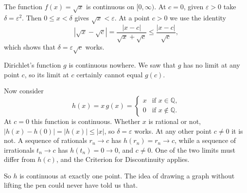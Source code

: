 \begin{example}\label{ex:sqrt-continuous}
The function $f(x) = \sqrt{x}$ is continuous on $[0, \infty)$.  At $c = 0$, given $\varepsilon > 0$ take $\delta = \varepsilon^2$.  Then $0 \leq x < \delta$ gives $\sqrt{x} < \varepsilon$.  At a point $c > 0$ we use the identity
\[ |\sqrt{x} - \sqrt{c}| = \frac{|x - c|}{\sqrt{x} + \sqrt{c}} \leq \frac{|x - c|}{\sqrt{c}}, \]
which shows that $\delta = \varepsilon\sqrt{c}$ works.
\end{example}

\begin{example}
Dirichlet's function $g$ is continuous nowhere.  We saw that $g$ has no limit at any point $c$, so its limit at $c$ certainly cannot equal $g(c)$.
\end{example}

\begin{example}\label{ex:one-point}
Now consider
\begin{displaymath}
   h(x) = x\,g(x) = \left\{
     \begin{array}{ll}
       x & \text{if } x \in \mathbb{Q}, \\
       0 & \text{if } x \notin \mathbb{Q}.
     \end{array}
   \right.
\end{displaymath}
At $c = 0$ this function is continuous.  Whether $x$ is rational or not, $|h(x) - h(0)| = |h(x)| \leq |x|$, so $\delta = \varepsilon$ works.  At any other point $c \neq 0$ it is not.  A sequence of rationals $r_n \to c$ has $h(r_n) = r_n \to c$, while a sequence of irrationals $t_n \to c$ has $h(t_n) = 0 \to 0$, and $c \neq 0$.  One of the two limits must differ from $h(c)$, and the Criterion for Discontinuity applies.

So $h$ is continuous at exactly one point.  The idea of drawing a graph without lifting the pen could never have told us that.
\end{example}

\begin{marginfigure}
\centering
{}
\caption{The function $h$ lives on two dotted lines.  Near the origin both lines are inside the blue band, and nowhere else do they come together.}
\end{marginfigure}

